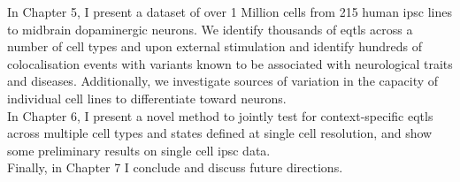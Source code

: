 In Chapter 5, I present a dataset of over 1 Million cells from 215 human \gls{ipsc} lines to midbrain dopaminergic neurons.
We identify thousands of \glspl{eqtl} across a number of cell types and upon external stimulation and identify hundreds of colocalisation events with variants known to be associated with neurological traits and diseases.
Additionally, we investigate sources of variation in the capacity of individual cell lines to differentiate toward neurons.\\

In Chapter 6, I present a novel method to jointly test for context-specific \glspl{eqtl} across multiple cell types and states defined at single cell resolution, and show some preliminary results on single cell \gls{ipsc} data. \\

Finally, in Chapter 7 I conclude and discuss future directions.